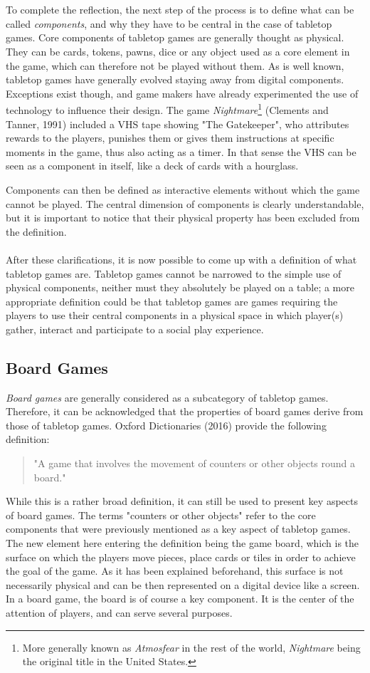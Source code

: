 \\\\
To complete the reflection, the next step of the process is to define what can be called \textit{components}, and why they have to be central in the case of tabletop games. Core components of tabletop games are generally thought as physical. They can be cards, tokens, pawns, dice or any object used as a core element in the game, which can therefore not be played without them. As is well known, tabletop games have generally evolved staying away from digital components. Exceptions exist though, and game makers have already experimented the use of technology to influence their design. The game \textit{Nightmare}\footnote{More generally known as \textit{Atmosfear} in the rest of the world, \textit{Nightmare} being the original title in the United States.} (Clements and Tanner, 1991)\cite{game:atmo} included a VHS tape showing "The Gatekeeper", who attributes rewards to the players, punishes them or gives them instructions at specific moments in the game, thus also acting as a timer. In that sense the VHS can be seen as a component in itself, like a deck of cards with a hourglass.

Components can then be defined as interactive elements without which the game cannot be played. The central dimension of components is clearly understandable, but it is important to notice that their physical property has been excluded from the definition.
\\\\
After these clarifications, it is now possible to come up with a definition of what tabletop games are. Tabletop games cannot be narrowed to the simple use of physical components, neither must they absolutely be played on a table; a more appropriate definition could be that tabletop games are games requiring the players to use their central components in a physical space in which player(s) gather, interact and participate to a social play experience. 
\subsection{Board Games}
\textit{Board games} are generally considered as a subcategory of tabletop games. Therefore, it can be acknowledged that the properties of board games derive from those of tabletop games. Oxford Dictionaries (2016)\cite{web:oxford} provide the following definition:
\begin{quotation}
"A game that involves the movement of counters or other objects round a board."
\end{quotation}
While this is a rather broad definition, it can still be used to present key aspects of board games. The terms "counters or other objects" refer to the core components that were previously mentioned as a key aspect of tabletop games. The new element here entering the definition being the game board, which is the surface on which the players move pieces, place cards or tiles in order to achieve the goal of the game. As it has been explained beforehand, this surface is not necessarily physical and can be then represented on a digital device like a screen. In a board game, the board is of course a key component. It is the center of the attention of players, and can serve several purposes.

